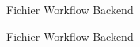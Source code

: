 \begin{figure}[h]
    \begin{adjustwidth}{-3.5cm}{-3.5cm}
    \centering
    \caption{Fichier Workflow Backend}
    \label{fig:ansible11}
    \end{adjustwidth}
\end{figure}
\newpage
\begin{figure}[h]
    \begin{adjustwidth}{-3.5cm}{-3.5cm}
    \centering
    \caption{Fichier Workflow Backend}
    \label{fig:ansible12}
    \end{adjustwidth}
\end{figure}
